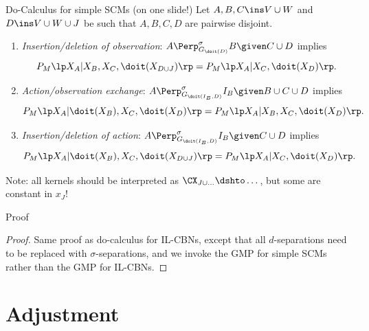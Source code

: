 \begin{frame}{Do-Calculus for simple SCMs (on one slide!)}
  Let $A,B,C \ins V \cup W$ and $D \ins V \cup W \cup J$ be such that $A,B,C,D$ are pairwise disjoint.
  \begin{enumerate}
    \item \emph{Insertion/deletion of observation}: 
      $A \Perp^\sigma_{G_{\doit(D)}} B \given C \cup D$ implies
      \[ P_{M}\lp X_A|X_B,X_C,\doit(X_{D\cup J})\rp = P_{M}\lp X_A|X_C,\doit(X_D)\rp.\]
    \item \emph{Action/observation exchange}: $A \Perp^\sigma_{G_{\doit(I_B,D)}} I_B \given B \cup C \cup D$ implies
      \[ P_{M}\lp X_A|\doit(X_B),X_C,\doit(X_D)\rp  =  P_{M}\lp X_A|X_B,X_C,\doit(X_D)\rp.\]
    \item \emph{Insertion/deletion of action}: $A \Perp^\sigma_{G_{\doit(I_B,D)}} I_B \given C  \cup D$ implies
      \[ P_{M}\lp X_A|\doit(X_B),X_C,\doit(X_{D\cup J})\rp = P_{M}\lp X_A|X_C,\doit(X_{D})\rp.\]
  \end{enumerate}
  Note: all kernels should be interpreted as $\CX_{J \cup \dots} \dshto \dots$, but some are constant in $x_J$!
\end{frame}

\begin{frame}{Proof}
  \begin{proof}
    Same proof as do-calculus for IL-CBNs, except that all $d$-separations need to be replaced with $\sigma$-separations,
    and we invoke the GMP for simple SCMs rather than the GMP for IL-CBNs.
  \end{proof}
\end{frame}

\part{Adjustment}
\frame{\partpage}

